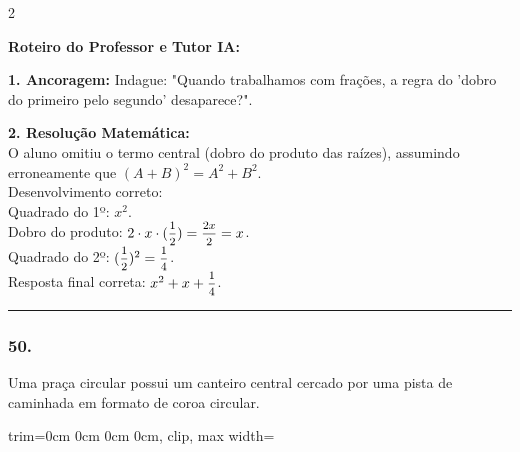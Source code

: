 \begin{multicols*}{2}
\ifgabarito
    \begin{tcolorbox}[colback=CorTitUm!5, colframe=CorTitUm, boxrule=1pt, arc=4pt, left=6pt, right=6pt, top=6pt, bottom=6pt]
    \small\textbf{\textcolor{CorTitUm}{Roteiro do Professor e Tutor IA:}}\par\vspace{0.1cm}
    \color{CinzaEscuro}
    \textbf{1. Ancoragem:} Indague: "Quando trabalhamos com frações, a regra do 'dobro do primeiro pelo segundo' desaparece?".\par\vspace{0.1cm}
    \textbf{2. Resolução Matemática:}\\
    O aluno omitiu o termo central (dobro do produto das raízes), assumindo erroneamente que $(A+B)^2 = A^2 + B^2$.\\
    Desenvolvimento correto:\\
    Quadrado do 1º: $x^2$.\\
    Dobro do produto: $2 \cdot x \cdot ( \mfrac{1}{2} ) = \mfrac{2x}{2} = x$.\\
    Quadrado do 2º: $( \mfrac{1}{2} )^2 = \mfrac{1}{4}$.\\
    Resposta final correta: $x^2 + x + \mfrac{1}{4}$.
    \end{tcolorbox}
\fi

\par\vspace{\espacoQuestao}

\noindent\textcolor{CorLinha}{\rule{\linewidth}{0.5pt}} 
\par\vspace{\espacoPreQuestao}
\subsubsection*{50.} 
\begin{enunciadoLiteral}
Uma praça circular possui um canteiro central cercado por uma pista de caminhada em formato de coroa circular. 

\begin{center}
\begin{adjustbox}{trim=0cm 0cm 0cm 0cm, clip, max width=\larguraTikz}
\end{adjustbox}
\end{center}
\end{enunciadoLiteral}
\end{multicols*}
